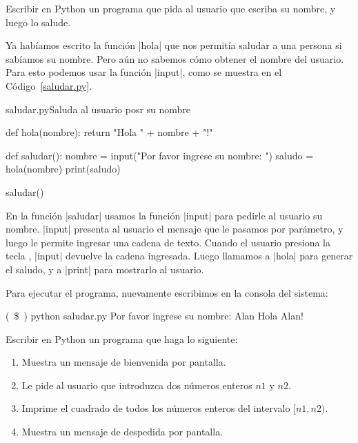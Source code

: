 \begin{problema}
Escribir en Python un programa que pida al usuario que escriba su nombre, y
luego lo salude.

\begin{solucion}
Ya habíamos escrito la función |hola| que nos permitía saludar a una
persona si sabíamos su nombre. Pero aún no sabemos cómo obtener el nombre del
usuario. Para esto podemos usar la función |input|, como se muestra en el
Código~\ref{saludar.py}.

\begin{codigo}{saludar.py}{Saluda al usuario posr su nombre}
\label{saludar.py}
\begin{codigo-python}
def hola(nombre):
    return "Hola " + nombre + "!"

def saludar():
    nombre = input("Por favor ingrese su nombre: ")
    saludo = hola(nombre)
    print(saludo)

saludar()
\end{codigo-python}
\end{codigo}
\end{solucion}
\end{problema}

En la función |saludar| usamos la función |input| para pedirle al usuario su
nombre. |input| presenta al usuario el mensaje que le pasamos por parámetro,
y luego le permite ingresar una cadena de texto. Cuando el usuario presiona la
tecla , |input| devuelve la cadena ingresada. Luego llamamos a
|hola| para generar el saludo, y a |print| para mostrarlo al usuario.

Para ejecutar el programa, nuevamente escribimos en la consola del sistema:

\begin{codigo-nohl-sn}
(~\$~) python saludar.py
Por favor ingrese su nombre: Alan
Hola Alan!
\end{codigo-nohl-sn}

\begin{problema}
Escribir en Python un programa que haga lo siguiente:

\begin{enumerate}
\item Muestra un mensaje de bienvenida por pantalla.
\item Le pide al usuario que introduzca dos números enteros $n1$ y $n2$.
\item Imprime el cuadrado de todos los números enteros del intervalo $[n1, n2)$.
\item Muestra un mensaje de despedida por pantalla.
\end{enumerate}
\end{problema}

